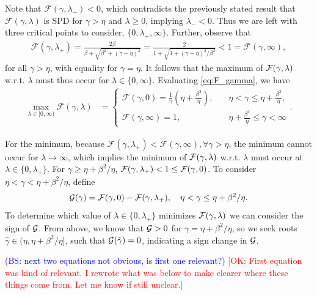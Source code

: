 \documentclass[a4paper,10pt]{article}
\newcommand{\tcb}{\textcolor{blue}}
\newcommand{\tcr}{\textcolor{red}}
\begin{document}
Note that $\mathcal{F}(\gamma,\lambda_-) < 0$, which contradicts the previously
stated result that $\mathcal{F}(\gamma,\lambda)$ is SPD for $\gamma > \eta$
and $\lambda\geq 0$, implying $\lambda_- < 0$.
Thus we are left with three critical points to consider, 
$\{0,\lambda_+,\infty\}$. Further, observe that
%
\begin{align*}
\mathcal{F}(\gamma,\lambda_+) = \frac{2\beta}{\beta + \sqrt{\beta^2 + (\gamma-\eta)^2}}
	= \frac{2}{1 + \sqrt{1 + (\gamma-\eta)^2/\beta^2}} < 1 = \mathcal{F}(\gamma,\infty),
\end{align*}
%
for all $\gamma > \eta$, with equality for $\gamma = \eta$.
It follows that the maximum of ${\cal F}(\gamma,\lambda)$ w.r.t.
$\lambda$ must thus occur for $\lambda \in \{ 0, \infty \}$. Evaluating
\eqref{eq:F_gamma}, we have
%
\begin{align*}
\max_{\lambda\in[0,\infty)} \mathcal{F}(\gamma,\lambda) & = 
\begin{cases}
\displaystyle
\mathcal{F}(\gamma,0) 
= 
\frac{1}{\gamma} \left(\eta + \frac{\beta^2}{\eta} \right), 
\quad 
& \eta < \gamma \leq \eta +  \tfrac{\beta^2}{\eta}, \\
\displaystyle
\mathcal{F}(\gamma,\infty) 
= 
1, \quad & \eta + \tfrac{\beta^2}{\eta} \leq \gamma < \infty
\end{cases}.
\end{align*}
%

For the minimum, because $\mathcal{F}(\gamma,\lambda_+) < \mathcal{F}(\gamma,\infty),
\forall \gamma > \eta$, the minimum cannot occur for $\lambda \to \infty$, which
implies the minimum of ${\cal F}(\gamma,\lambda)$ w.r.t. $\lambda$ must occur
at $\lambda \in \{0, \lambda_+\}$. For $\gamma \geq \eta + \beta^2 / \eta$,
${\cal F}(\gamma, \lambda_+) < 1 \leq {\cal F}(\gamma, 0)$. To consider
$\eta < \gamma < \eta + \beta^2 / \eta$, define
%
\begin{align*}
{\cal G}(\gamma) = \mathcal{F}(\gamma,0) -  \mathcal{F}(\gamma,\lambda_+),
	\quad \eta < \gamma \leq \eta + \beta^2 / \eta.
\end{align*}
%
To determine which value of ${\lambda} \in \{0, \lambda_+ \}$ minimizes
${\cal F}(\gamma, \lambda)$ we can consider the sign of ${\cal G}$. From
above, we know that ${\cal G} > 0$ for $\gamma = \eta + \beta^2/\eta$, so
we seek roots $\hat{\gamma}\in(\eta,\eta+\beta^2/\eta]$, such that
${\cal G}(\hat{\gamma}) = 0$, indicating a sign change in ${\cal G}$.

\tcb{(BS: next two equations not obvious, is first one relevant?)} \tcr{[OK: First equation was kind of relevant. I rewrote what was below to make clearer where these things come from. Let me know if still unclear.]}
\end{document}
